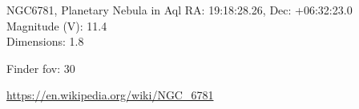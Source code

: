 \begin{block}{NGC6781, Planetary Nebula in Aql}
    RA: 19:18:28.26, Dec: +06:32:23.0 \\ 
    Magnitude (V): 11.4 \\ 
    Dimensions: 1.8 

    Finder fov: 30 

    \url{https://en.wikipedia.org/wiki/NGC_6781} 
\end{block}